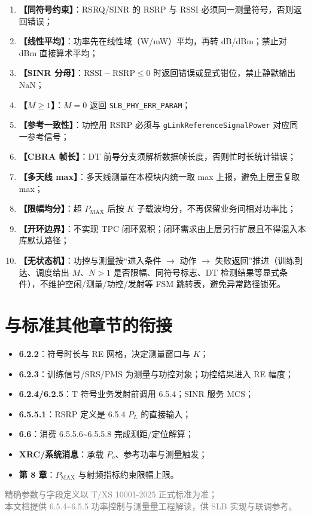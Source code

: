 \documentclass[11pt,a4paper]{ctexart}
\begin{document}
\begin{enumerate}[nosep]
  \item \textbf{【同符号约束】}：RSRQ/SINR 的 RSRP 与 RSSI 必须同一测量符号，否则返回错误；
  \item \textbf{【线性平均】}：功率先在线性域（W/mW）平均，再转 dB/dBm；禁止对 dBm 直接算术平均；
  \item \textbf{【SINR 分母】}：$\mathrm{RSSI}-\mathrm{RSRP}\leq 0$ 时返回错误或显式钳位，禁止静默输出 NaN；
  \item \textbf{【$M\geq 1$】}：$M{=}0$ 返回 \texttt{SLB\_PHY\_ERR\_PARAM}；
  \item \textbf{【参考一致性】}：功控用 RSRP 必须与 \texttt{gLinkReferenceSignalPower} 对应同一参考信号；
  \item \textbf{【CBRA 帧长】}：DT 前导分支须解析数据帧长度，否则忙时长统计错误；
  \item \textbf{【多天线 max】}：多天线测量在本模块内统一取 max 上报，避免上层重复取 max；
  \item \textbf{【限幅均分】}：超 $P_{\mathrm{MAX}}$ 后按 $K$ 子载波均分，不再保留业务间相对功率比；
  \item \textbf{【开环边界】}：不实现 TPC 闭环累积；闭环需求由上层另行扩展且不得混入本库默认路径；
  \item \textbf{【无状态机】}：功控与测量按``进入条件 $\rightarrow$ 动作 $\rightarrow$ 失败返回''推进（训练到达、调度给出 $M$、$N{>}1$ 是否限幅、同符号标志、DT 检测结果等显式条件），不维护空闲/测量/功控/发射等 FSM 跳转表，避免异常路径锁死。
\end{enumerate}

\section{与标准其他章节的衔接}

\begin{itemize}[nosep]
  \item \textbf{6.2.2}：符号时长与 RE 网格，决定测量窗口与 $K$；
  \item \textbf{6.2.3}：训练信号/SRS/PMS 为测量与功控对象；功控结果进入 RE 幅度；
  \item \textbf{6.2.4/6.2.5}：T 符号业务发射前调用 6.5.4；SINR 服务 MCS；
  \item \textbf{6.5.5.1}：RSRP 定义是 6.5.4 $P_L$ 的直接输入；
  \item \textbf{6.6}：消费 6.5.5.6\textasciitilde 6.5.5.8 完成测距/定位解算；
  \item \textbf{XRC/系统消息}：承载 $P_o$、参考功率与测量触发；
  \item \textbf{第 8 章}：$P_{\mathrm{MAX}}$ 与射频指标约束限幅上限。
\end{itemize}

\vfill
\begin{center}
\small\textcolor{gray}{精确参数与字段定义以 T/XS 10001-2025 正式标准为准；\\
本文档提供 6.5.4\textasciitilde 6.5.5 功率控制与测量量工程解读，供 SLB 实现与联调参考。}
\end{center}
\end{document}

